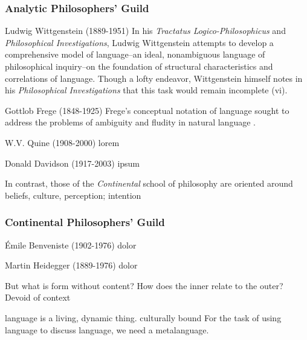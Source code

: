 \documentclass[10pt,twoside,twocolumn,openany,nomultitoc]{book}
\begin{document}
\subsubsection{Analytic Philosophers' Guild}
    \begin{DndComment}{Ludwig Wittgenstein (1889-1951)}
    In his \textit{Tractatus Logico-Philosophicus} and \textit{Philosophical Investigations}, Ludwig Wittgenstein attempts to develop a comprehensive model of language--an ideal, nonambiguous language of philosophical inquiry--on the foundation of structural characteristics and correlations of language.  Though a lofty endeavor, Wittgenstein himself notes in his \textit{Philosophical Investigations} that this task would remain incomplete (vi). 
    \end{DndComment} 
    \begin{DndComment}{Gottlob Frege (1848-1925)}
    Frege's conceptual notation of language sought to address the problems of ambiguity and fludity in natural language \parencite[p. 4]{big-questions}.
    \end{DndComment}
    \begin{DndComment}{W.V. Quine (1908-2000)}
    lorem
    \end{DndComment}
    \begin{DndComment}{Donald Davidson (1917-2003)}
    ipsum
    \end{DndComment}
    
        
In contrast, those of the \textit{Continental} school of philosophy are oriented around    
beliefs, culture, perception; intention  
    
\subsubsection{Continental Philosophers' Guild}
    \begin{DndComment}{Émile Benveniste (1902-1976)}
   dolor
    \end{DndComment}     
    \begin{DndComment}{Martin Heidegger (1889-1976)}
   dolor
    \end{DndComment}   

But what is form without content? How does the inner relate to the outer? 
Devoid of context

language is a living, dynamic thing. culturally bound
For the task of using language to discuss language, we need a metalanguage.    
\end{document}
